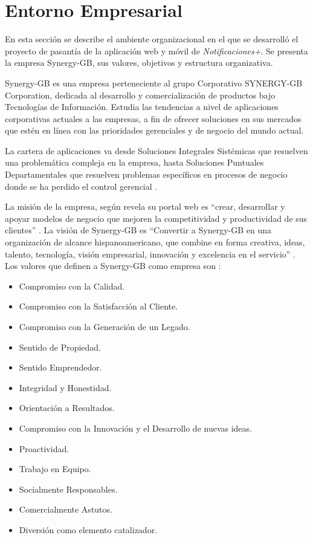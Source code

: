 \chapter{Entorno Empresarial} \label{chap:Entorno Empresarial}

\vspace{5 mm}


En esta sección se describe el ambiente organizacional en el que se desarrolló el proyecto de pasantía de la aplicación web y móvil de \textit{Notificaciones+}. Se presenta la empresa Synergy-GB, sus valores, objetivos y estructura organizativa.


Synergy-GB es una empresa perteneciente al grupo Corporativo SYNERGY-GB Corporation, dedicada al desarrollo y comercialización de productos bajo Tecnologías de Información. Estudia las tendencias a nivel de aplicaciones corporativas actuales a las empresas, a fin de ofrecer soluciones en sus mercados que estén en línea con las prioridades gerenciales y de negocio del mundo actual.

La cartera de aplicaciones va desde Soluciones Integrales Sistémicas que resuelven una problemática compleja en la empresa, hasta Soluciones Puntuales Departamentales que resuelven problemas específicos en procesos de negocio donde se ha perdido el control gerencial  \cite{ESGB0}.


La misión de la empresa, según revela su portal web es “crear, desarrollar y apoyar modelos de negocio que mejoren la competitividad y productividad de sus clientes”  \cite{ESGB0}. 
La visión de Synergy-GB es “Convertir a Synergy-GB en una organización de alcance hispanoamericano, que combine en forma creativa, ideas, talento, tecnología, visión empresarial, innovación y excelencia en el servicio”  \cite{ESGB0}. 
Los valores que definen a Synergy-GB como empresa son \cite{ESGB0}:
\begin{itemize}[noitemsep,nolistsep]
\item Compromiso con la Calidad.
\item Compromiso con la Satisfacción al Cliente.
\item Compromiso con la Generación de un Legado.
\item Sentido de Propiedad.
\item Sentido Emprendedor.
\item Integridad y Honestidad.
\item Orientación a Resultados.
\item Compromiso con la Innovación y el Desarrollo de nuevas ideas.
\item Proactividad.
\item Trabajo en Equipo.
\item Socialmente Responsables.
\item Comercialmente Astutos.
\item Diversión como elemento catalizador.
\end{itemize}

